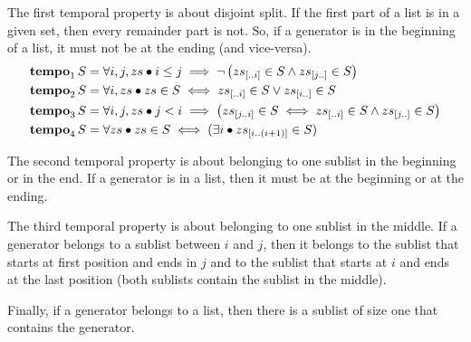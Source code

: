 \documentclass[en,twoside,onehalfspacing,phd]{risethesis}
\makeatletter
\newcommand{\todo}[1]{\@latex@warning{TODO #1}}
\newcommand{\sliceright}[2]{\ensuremath #1_{\left[..#2\right]}}
\newcommand{\sliceleft}[2]{\ensuremath #1_{\left[#2..\right]}}
\newcommand{\slice}[3]{\ensuremath #1_{\left[#2..#3\right]}}
\def\Tempotext{Tempo\xspace}
\def\tempoop{\ensuremath\operatorname{\mathbf{tempo}}}
\newcommand{\tempo}[2][1-4]{\ensuremath\tempoop_{#1} #2}
\makeatother
\begin{document}
The first temporal property is about disjoint split.
If the first part of a list is in a given set, then every remainder part is not.
So, if a generator is in the beginning of a list, it must not be at the ending (and vice-versa).
%
%
\begin{subequations}
\begin{align}
\tempo[1]{S} &= \forall i, j, zs \bullet
  i \le j \implies
  \lnot \left(
    \sliceright{zs}{i} \in S \land \sliceleft{zs}{j} \in S
  \right)\label{def:tempo1}\\
\tempo[2]{S} &= \forall i, zs \bullet
  zs \in S \iff
  \sliceright{zs}{i} \in S \lor \sliceleft{zs}{i} \in S\label{def:tempo2}\\
\tempo[3]{S} &= \forall i, j, zs \bullet
  j < i \implies
  \left(
    \slice{zs}{j}{i} \in S \iff \sliceright{zs}{i} \in S \land \sliceleft{zs}{j} \in S
  \right)\label{def:tempo3}\\
\tempo[4]{S} &= \forall zs \bullet zs \in S \iff (\exists i \bullet \slice{zs}{i}{\left(i+1\right)} \in S)\label{def:tempo4}
\end{align}
\end{subequations}

The second temporal property is about belonging to one sublist in the beginning or in the end.
If a generator is in a list, then it must be at the beginning or at the ending.
%
%

The third temporal property is about belonging to one sublist in the middle.
If a generator belongs to a sublist between $i$ and $j$, then it belongs to the sublist that starts at first position and ends in $j$ and to the sublist that starts at $i$ and ends at the last position (both sublists contain the sublist in the middle).
%
%

Finally, if a generator belongs to a list, then there is a sublist of size one that contains the generator.
%
%
\end{document}
